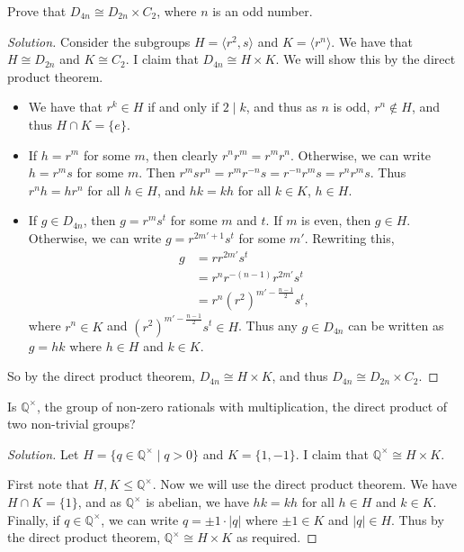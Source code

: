 \documentclass[11pt]{article}
\begin{document}
\begin{example}\label{ex:dihedral}
	Prove that $D_{4n} \cong D_{2n} \times C_2$, where $n$ is an odd number.
\end{example}
\begin{proof}[Solution]
	Consider the subgroups $H = \langle r^2, s \rangle$ and $K = \langle r^n \rangle$. We have that $H \cong D_{2n}$ and $K \cong C_2$. I claim that $D_{4n} \cong H \times K$. We will show this by the direct product theorem.
	\begin{itemize}
		\item We have that $r^k \in H$ if and only if $2 \mid k$, and thus as $n$ is odd, $r^n \not \in H$, and thus $H \cap K = \{e \}$.
		\item If $h = r^m$ for some $m$, then clearly $r^n r^m = r^m r^n$. Otherwise, we can write $h = r^m s$ for some $m$. Then $r^m s r^n = r^m r^{-n} s = r^{-n} r^m s = r^n r^m s$. Thus $r^n h = h r^n$ for all $h \in H$, and $hk = kh$ for all $k \in K$, $h \in H$.
		\item If $g \in D_{4n}$, then $g = r^m s^t$ for some $m$ and $t$.
		If $m$ is even, then $g \in H$. Otherwise, we can write $g = r^{2m' + 1}s^t$ for some $m'$. Rewriting this,
		\begin{align*}
			g &= r r^{2m'} s^t \\
			  &= r^n r^{-(n - 1)} r^{2m'} s^t  \\
			  &= r^n (r^2)^{m' - \frac{n - 1}{2}} s^t,
		\end{align*}
		where $r^n \in K$ and $(r^2)^{m' - \frac{n - 1}{2}} s^t \in H$. 
		Thus any $g \in D_{4n}$ can be written as $g = hk$ where $h \in H$ and $k \in K$.
	\end{itemize}
	So by the direct product theorem, $D_{4n} \cong H \times K$, and thus $D_{4n} \cong D_{2n} \times C_2$.
\end{proof}

\begin{example}
	Is $\mathbb{Q}^\times$, the group of non-zero rationals with multiplication, the direct product of two non-trivial groups?
\end{example}
\begin{proof}[Solution]
	Let $H = \{q \in \mathbb{Q}^\times \mid q > 0 \}$ and $K = \{1, -1\}$. I claim that $\mathbb{Q}^\times \cong H \times K$. 
	
	First note that $H, K \leq \mathbb{Q}^\times$. Now we will use the direct product theorem. We have $H \cap K = \{1 \}$, and as $\mathbb{Q}^\times$ is abelian, we have $hk = kh$ for all $h \in H$ and $k \in K$. Finally, if $q \in \mathbb{Q}^\times$, we can write $q = \pm 1 \cdot |q|$ where $\pm 1 \in K$ and $|q| \in H$. Thus by the direct product theorem, $\mathbb{Q}^\times \cong H \times K$ as required.
\end{proof}
\end{document}
